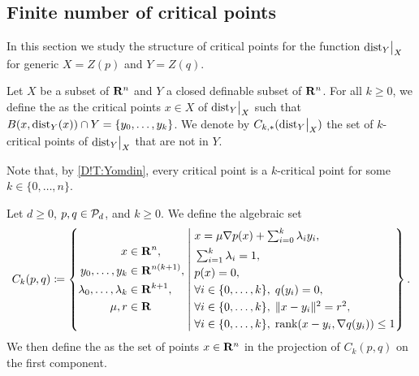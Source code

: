 \subsection{Finite number of critical points}

In this section we study the structure of critical points for the function $\mathord{\operatorname{dist}}_Y\big|_X$ for generic $X = Z(p)$ and $Y = Z(q)$.

\begin{definition}
\label{D!D:k-crit-pt}
  Let $X$ be a subset of $\mathbf{R}^n$ and $Y$ a closed definable subset of $\mathbf{R}^n$. For all $k \geq 0$, we define the  as the critical points $x \in X$ of $\mathord{\operatorname{dist}}_Y\big|_X$ such that  $B(x, \operatorname{dist}_Y(x)) \cap Y=\{y_0, \ldots, y_k\}$.
  We denote by $C_{k, *}(\mathord{\operatorname{dist}}_Y\big|_X)$ the set of $k$-critical points of $\mathord{\operatorname{dist}}_Y\big|_X$ that are not in $Y$. 
\end{definition}

Note that, by \cref{D!T:Yomdin}, every critical point is a $k$-critical point for some $k \in \{0, \ldots, n\}$.

\begin{definition}
\label{D!D:algebraic-critical-points}
  Let $d \geq 0$, $p, q \in \mathcal{P}_d$, and $k \geq 0$. We define the algebraic set
  \[
    C_k(p, q) \coloneq \left\{
    \begin{aligned}
      x & \in \mathbf{R}^n, \\
      y_0, \ldots, y_k & \in \mathbf{R}^{n(k + 1)}, \\
      \lambda_0, \ldots, \lambda_k & \in \mathbf{R}^{k + 1}, \\
      \mu, r & \in \mathbf{R}
    \end{aligned}
    \;\middle|\;
    \begin{aligned}
      & \textstyle x = \mu \nabla p(x) + \sum_{i = 0}^k \lambda_i y_i, \\
      & \textstyle \sum_{i = 1}^k \lambda_i = 1, \\
      & \textstyle p(x) = 0, \\
      & \textstyle \forall i \in \{0, \ldots, k\}, \; q(y_i) = 0, \\
      & \textstyle \forall i \in \{0, \ldots, k\}, \; \|x - y_i\|^2 = r^2, \\
      & \textstyle \forall i \in \{0, \ldots, k\}, \; \textnormal{rank}(x - y_i, \nabla q(y_i)) \leq 1
    \end{aligned}
    \right\}.
  \]
  We then define the  as the set of points $x \in \mathbf{R}^n$ in the projection of $C_k(p, q)$ on the first component.
\end{definition}

